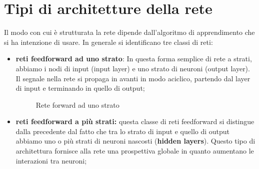 \section{Tipi di architetture della rete} %
\label{sec:tipi_di_architetture_della_rete}
Il modo con cui è strutturata la rete dipende dall'algoritmo di apprendimento che si ha intenzione di usare. In generale si identificano tre classi di reti:
\begin{itemize}
    \item \textbf{reti feedforward ad uno strato}: In questa forma semplice di rete a strati, abbiamo i nodi di input (input layer) e uno strato di neuroni (output layer). Il segnale nella rete si propaga in avanti in modo aciclico, partendo dal layer di input e terminando in quello di output;
    \begin{figure}[h!]
        \centering
        \caption{Rete forward ad uno strato}
    \end{figure}
    
    \item \textbf{reti feedforward a più strati:} questa classe di reti feedforward si distingue dalla precedente dal fatto che tra lo strato di input e quello di output abbiamo uno o più strati di neuroni nascosti (\textbf{hidden layers}).
Questo tipo di architettura fornisce alla rete una prospettiva globale in quanto aumentano le interazioni tra neuroni;
    \begin{figure}[h!]
        \centering
        \begin{tikzpicture}[->, node distance=\layersep]


\end{tikzpicture}
\end{figure}
\end{itemize}
